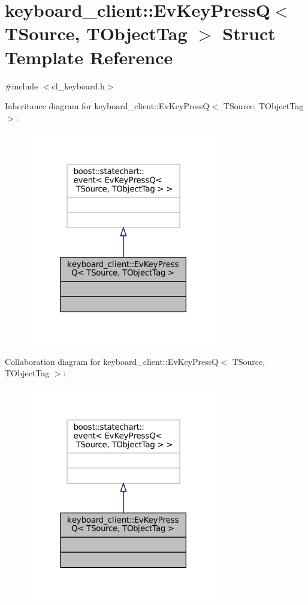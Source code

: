 \hypertarget{structkeyboard__client_1_1EvKeyPressQ}{}\section{keyboard\+\_\+client\+:\+:Ev\+Key\+PressQ$<$ T\+Source, T\+Object\+Tag $>$ Struct Template Reference}
\label{structkeyboard__client_1_1EvKeyPressQ}


{\ttfamily \#include $<$cl\+\_\+keyboard.\+h$>$}



Inheritance diagram for keyboard\+\_\+client\+:\+:Ev\+Key\+PressQ$<$ T\+Source, T\+Object\+Tag $>$\+:
\nopagebreak
\begin{figure}[H]
\begin{center}
\leavevmode
\includegraphics[width=237pt]{structkeyboard__client_1_1EvKeyPressQ__inherit__graph}
\end{center}
\end{figure}


Collaboration diagram for keyboard\+\_\+client\+:\+:Ev\+Key\+PressQ$<$ T\+Source, T\+Object\+Tag $>$\+:
\nopagebreak
\begin{figure}[H]
\begin{center}
\leavevmode
\includegraphics[width=237pt]{structkeyboard__client_1_1EvKeyPressQ__coll__graph}
\end{center}
\end{figure}


